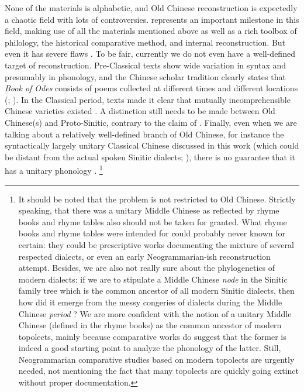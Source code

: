 \documentclass[UTF8, a4paper, oneside, scheme=plain, 12pt]{ctexrep}
\newcommand*{\citepage}[1]{p.~{#1}}
\newcommand*{\citepages}[1]{pp.~{#1}}
\newcommand{\work}[1]{\textit{#1}}
\begin{document}
None of the materials is alphabetic,
and Old Chinese reconstruction is expectedly a chaotic field with lots of controversies.
\citet{baxter2014old} represents an important milestone in this field,
making use of all the materials mentioned above as well as
a rich toolbox of philology, the historical comparative method, and internal reconstruction.
But even it has severe flaws \citep{harbsmeier2016irrefutable}.
To be fair, currently we do not even have a well-defined target of reconstruction.
Pre-Classical texts show wide variation in syntax and presumably in phonology,
and the Chinese scholar tradition clearly states that 
\work{Book of Odes} consists of poems collected at different times and different locations 
(; \citealt[\citepages{478-480}]{harbsmeier2016irrefutable}).
In the Classical period, texts made it clear that mutually incomprehensible Chinese varieties existed \citep[\citepages{446-447}]{harbsmeier2016irrefutable}.
A distinction still needs to be made between Old Chinese(s) and Proto-Sinitic,
contrary to the claim of \citet[\citepage{2}]{baxter2014old}.
Finally, even when we are talking about a relatively well-defined branch of Old Chinese,
for instance the syntactically largely unitary Classical Chinese discussed in this work
(which could be distant from the actual spoken Sinitic dialects; ),
there is no guarantee that it has a unitary phonology
\citep[\citepages{488-490}]{harbsmeier2016irrefutable}.%
\footnote{
    It should be noted that the problem is not restricted to Old Chinese.
    Strictly speaking, that there was a unitary Middle Chinese
    as reflected by rhyme books and rhyme tables also should not be taken for granted.
    What rhyme books and rhyme tables were intended for could probably never known for certain:
    they could be prescriptive works documenting the mixture of several respected dialects,
    or even an early Neogrammarian-ish reconstruction attempt.
    Besides, we are also not really sure about the phylogenetics of modern dialects:
    if we are to stipulate a Middle Chinese \emph{node} in the Sinitic family tree
    which is the common ancestor of all modern Sinitic dialects,
    then how did it emerge from the messy congeries of dialects during the Middle Chinese \emph{period} \citep[\citepages{477-478}]{harbsmeier2016irrefutable}?
    We are more confident with the notion of a unitary Middle Chinese (defined in the rhyme books)
    as the common ancestor of modern topolects,
    mainly because comparative works do suggest that the former is indeed a good starting point to analyze the phonology of the latter.
    Still, Neogrammarian comparative studies based on modern topolects are urgently needed,
    not mentioning the fact that many topolects are quickly going extinct without proper documentation.
}
\end{document}
